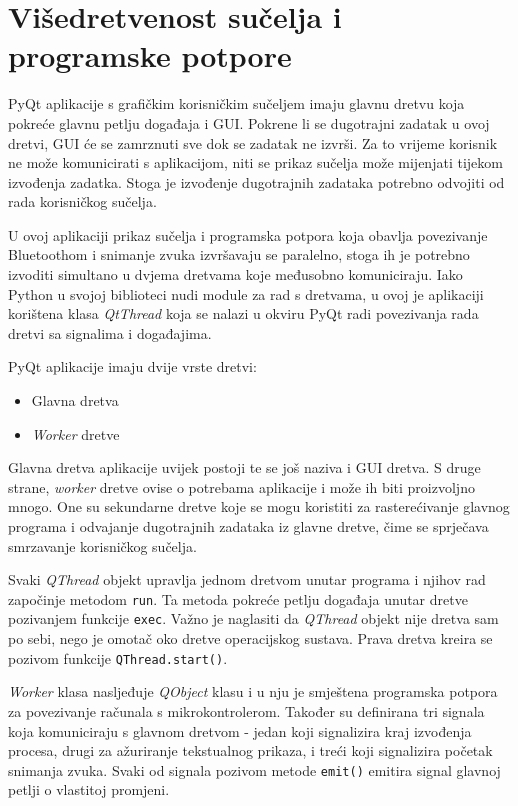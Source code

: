 \section{Višedretvenost sučelja i programske potpore}

PyQt aplikacije s grafičkim korisničkim sučeljem imaju glavnu dretvu koja pokreće glavnu petlju događaja i GUI. Pokrene li se dugotrajni zadatak u ovoj dretvi, GUI će se zamrznuti sve dok se zadatak ne izvrši. Za to vrijeme korisnik ne može komunicirati s aplikacijom, niti se prikaz sučelja može mijenjati tijekom izvođenja zadatka. Stoga je izvođenje dugotrajnih zadataka potrebno odvojiti od rada korisničkog sučelja.

U ovoj aplikaciji prikaz sučelja i programska potpora koja obavlja povezivanje Bluetoothom i snimanje zvuka izvršavaju se paralelno, stoga ih je potrebno izvoditi simultano u dvjema dretvama koje međusobno komuniciraju. Iako Python u svojoj biblioteci nudi module za rad s dretvama, u ovoj je aplikaciji korištena klasa \textit{QtThread} koja se nalazi u okviru PyQt radi povezivanja rada dretvi sa signalima i događajima.

PyQt aplikacije imaju dvije vrste dretvi:
\begin{itemize}
	\item Glavna dretva
	\item \textit{Worker} dretve
\end{itemize}

Glavna dretva aplikacije uvijek postoji te se još naziva i GUI dretva. S druge strane, \textit{worker} dretve ovise o potrebama aplikacije i može ih biti proizvoljno mnogo. One su sekundarne dretve koje se mogu koristiti za rasterećivanje glavnog programa i odvajanje dugotrajnih zadataka iz glavne dretve, čime se sprječava smrzavanje korisničkog sučelja. 

Svaki \textit{QThread} objekt upravlja jednom dretvom unutar programa i njihov rad započinje metodom \lstinline|run|. Ta metoda pokreće petlju događaja unutar dretve pozivanjem funkcije \lstinline|exec|. Važno je naglasiti da \textit{QThread} objekt nije dretva sam po sebi, nego je omotač oko dretve operacijskog sustava. Prava dretva kreira se pozivom funkcije \lstinline|QThread.start()|.

\textit{Worker} klasa nasljeđuje \textit{QObject} klasu i u nju je smještena programska potpora za povezivanje računala s mikrokontrolerom. Također su definirana tri signala koja komuniciraju s glavnom dretvom - jedan koji signalizira kraj izvođenja procesa, drugi za ažuriranje tekstualnog prikaza, i treći koji signalizira početak snimanja zvuka. Svaki od signala pozivom metode \lstinline|emit()| emitira signal glavnoj petlji o vlastitoj promjeni. 

